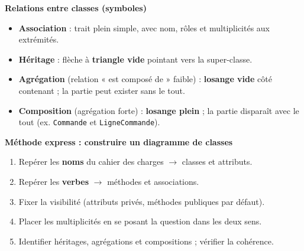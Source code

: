\documentclass[11pt]{article}
\begin{document}
\begin{bilan}
\textbf{Relations entre classes (symboles)}
\begin{itemize}
  \item \textbf{Association} : trait plein simple, avec nom, rôles et multiplicités aux extrémités.
  \item \textbf{Héritage} : flèche à \textbf{triangle vide} pointant vers la super-classe.
  \item \textbf{Agrégation} (relation « est composé de » faible) : \textbf{losange vide} côté contenant ; la partie peut exister sans le tout.
  \item \textbf{Composition} (agrégation forte) : \textbf{losange plein} ; la partie disparaît avec le tout (ex. \texttt{Commande} et \texttt{LigneCommande}).
\end{itemize}

\textbf{Méthode express : construire un diagramme de classes}
\begin{enumerate}
  \item Repérer les \textbf{noms} du cahier des charges $\rightarrow$ classes et attributs.
  \item Repérer les \textbf{verbes} $\rightarrow$ méthodes et associations.
  \item Fixer la visibilité (attributs privés, méthodes publiques par défaut).
  \item Placer les multiplicités en se posant la question dans les deux sens.
  \item Identifier héritages, agrégations et compositions ; vérifier la cohérence.
\end{enumerate}
\end{bilan}
\end{document}
